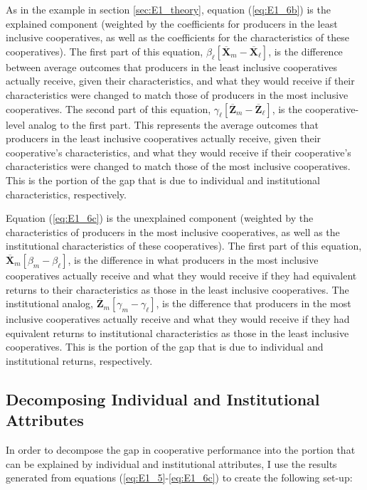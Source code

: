 \documentclass[11pt]{article}
\begin{document}
As in the example in section \ref{sec:E1_theory}, equation (\ref{eq:E1_6b}) is the explained component (weighted by the coefficients for producers in the least inclusive cooperatives, as well as the coefficients for the characteristics of these cooperatives). The first part of this equation, $\beta_{\ell}[\overline{\mathbf{X}}_{m} - \overline{\mathbf{X}}_{\ell}]$, is the difference between average outcomes that producers in the least inclusive cooperatives actually receive, given their characteristics, and what they would receive if their characteristics were changed to match those of producers in the most inclusive cooperatives. The second part of this equation, $\gamma_{\ell}[\overline{\mathbf{Z}}_{m} - \overline{\mathbf{Z}}_{\ell}]$, is the cooperative-level analog to the first part. This represents the average outcomes that producers in the least inclusive cooperatives actually receive, given their cooperative's characteristics, and what they would receive if their cooperative's characteristics were changed to match those of the most inclusive cooperatives. This is the portion of the gap that is due to individual and institutional characteristics, respectively.

Equation (\ref{eq:E1_6c}) is the unexplained component (weighted by the characteristics of producers in the most inclusive cooperatives, as well as the institutional characteristics of these cooperatives). The first part of this equation, $\overline{\mathbf{X}}_{m}[\beta_{m} - \beta_{\ell}]$, is the difference in what producers in the most inclusive cooperatives actually receive and what they would receive if they had equivalent returns to their characteristics as those in the least inclusive cooperatives. The institutional analog, $\overline{\mathbf{Z}}_{m}[\gamma_{m} - \gamma_{\ell}]$, is the difference that producers in the most inclusive cooperatives actually receive and what they would receive if they had equivalent returns to institutional characteristics as those in the least inclusive cooperatives. This is the portion of the gap that is due to individual and institutional returns, respectively.

\subsection{Decomposing Individual and Institutional Attributes} \label{sec:E1_dec}

In order to decompose the gap in cooperative performance into the portion that can be explained by individual and institutional attributes, I use the results generated from equations (\ref{eq:E1_5}-\ref{eq:E1_6c}) to create the following set-up: \\
\end{document}

